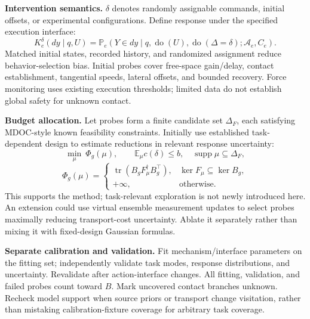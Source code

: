 \documentclass[11pt]{article}
\newcommand{\E}{\mathbb E}
\newcommand{\Prob}{\mathbb P}
\newcommand{\tr}{\operatorname{tr}}
\begin{document}
\textbf{Intervention semantics.} $\delta$ denotes randomly assignable commands,
initial offsets, or experimental configurations. Define response under the specified
execution interface:
\begin{equation}
 K_e^\delta(dy\mid q,U)
 =\Prob_e(Y\in dy\mid q,\operatorname{do}(U),
 \operatorname{do}(\Delta=\delta);\mathcal A_e,C_e).
 \label{eq:intervention}
\end{equation}
Matched initial states, recorded history, and randomized assignment reduce behavior-selection
bias. Initial probes cover free-space gain/delay, contact establishment, tangential
speeds, lateral offsets, and bounded recovery. Force monitoring uses existing execution
thresholds; limited data do not establish global safety for unknown contact.

\textbf{Budget allocation.} Let probes form a finite candidate set $\Delta_F$, each
satisfying MDOC-style known feasibility constraints. Initially use established
task-dependent design to estimate reductions in relevant response uncertainty:
\begin{equation}
 \min_{\mu}\ \Phi_g(\mu),\qquad
 \E_\mu c(\delta)\le b,\quad\operatorname{supp}\mu\subseteq\Delta_F,
\end{equation}
\begin{equation}
 \Phi_g(\mu)=
 \begin{cases}
 \tr(B_gF_\mu^\dagger B_g^\top),&\ker F_\mu\subseteq\ker B_g,\\
 +\infty,&\text{otherwise}.
 \end{cases}
 \label{eq:probe}
\end{equation}
This supports the method; task-relevant exploration is not newly introduced here.
An extension could use virtual ensemble measurement updates to select probes maximally
reducing transport-cost uncertainty. Ablate it separately rather than mixing it with
fixed-design Gaussian formulas.

\textbf{Separate calibration and validation.} Fit mechanism/interface parameters on
the fitting set; independently validate task modes, response distributions, and uncertainty.
Revalidate after action-interface changes. All fitting, validation, and failed probes
count toward $B$. Mark uncovered contact branches unknown. Recheck model support when
source priors or transport change visitation, rather than mistaking calibration-fixture
coverage for arbitrary task coverage.
\end{document}
